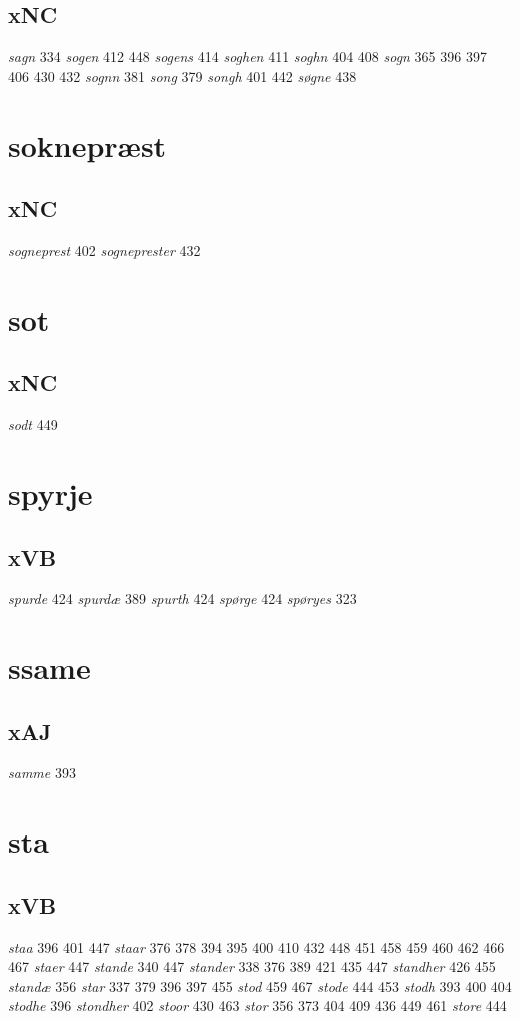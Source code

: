 \documentclass[a4paper,twocolumn]{article}
\begin{document}
\subsection{xNC}
\label{sec:orgb987c77}
\emph{sagn} 334 \emph{sogen} 412 448 \emph{sogens} 414 \emph{soghen} 411 \emph{soghn} 404 408 \emph{sogn} 365 396 397 406 430 432 \emph{sognn} 381 \emph{song} 379 \emph{songh} 401 442 \emph{søgne} 438 
\section{soknepræst}
\label{sec:org387bd2f}
\subsection{xNC}
\label{sec:orgff333e2}
\emph{sogneprest} 402 \emph{sogneprester} 432 
\section{sot}
\label{sec:org505553e}
\subsection{xNC}
\label{sec:orgd894cb1}
\emph{sodt} 449 
\section{spyrje}
\label{sec:org187e482}
\subsection{xVB}
\label{sec:org0648319}
\emph{spurde} 424 \emph{spurdæ} 389 \emph{spurth} 424 \emph{spørge} 424 \emph{spøryes} 323 
\section{ssame}
\label{sec:org7abad6f}
\subsection{xAJ}
\label{sec:org972a0a2}
\emph{samme} 393 
\section{sta}
\label{sec:orgb7970af}
\subsection{xVB}
\label{sec:org1f8ad00}
\emph{staa} 396 401 447 \emph{staar} 376 378 394 395 400 410 432 448 451 458 459 460 462 466 467 \emph{staer} 447 \emph{stande} 340 447 \emph{stander} 338 376 389 421 435 447 \emph{standher} 426 455 \emph{standæ} 356 \emph{star} 337 379 396 397 455 \emph{stod} 459 467 \emph{stode} 444 453 \emph{stodh} 393 400 404 \emph{stodhe} 396 \emph{stondher} 402 \emph{stoor} 430 463 \emph{stor} 356 373 404 409 436 449 461 \emph{store} 444 
\end{document}
